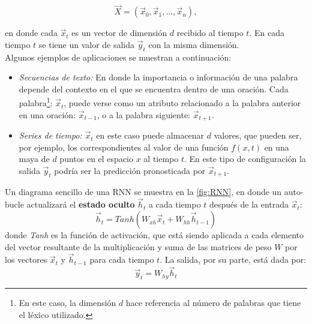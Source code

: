 \begin{equation}
  \label{eq:xdataRNN}
  \vec{X} = (\vec{x}_0, \vec{x}_1, \dots , \vec{x}_n),
\end{equation}

\noindent en donde cada $\vec{x}_t$ es un vector de dimensión $d$ recibido al tiempo $t$. En cada tiempo $t$ se tiene un valor de salida $\vec{y}_t$ con la misma dimensión.
\\
Algunos ejemplos de aplicaciones se muestran a continuación:  

\begin{itemize}[label=\textcolor{CTtitle}{\textbullet}]
\item \emph{Secuencias de texto:} \cite{Graves2013GeneratingSW} En donde la importancia o información de una palabra depende del contexto en el que se encuentra dentro de una oración. Cada palabra\footnote{En este caso, la dimensión $d$ hace referencia al número de palabras que tiene el léxico utilizado.}: $\vec{x}_t$,  puede verse como un atributo relacionado a la palabra anterior en una oración: $\vec{x}_{t-1}$, o a la palabra siguiente: $\vec{x}_{t+1}$.
 \item \emph{Series de tiempo:} \cite{ELMAN1990179} $\vec{x}_t$ en este caso puede almacenar $d$ valores, que pueden ser, por ejemplo, los correspondientes al valor de una función $f(x,t)$ en una maya de $d$ puntos en el espacio $x$ al tiempo $t$. En este tipo de configuración la salida $\vec{y}_t$ podría ser la predicción pronosticada por $\vec{x}_{t+1}$.
 \end{itemize}
  
Un diagrama sencillo de una \acs{RNN} se muestra en la \autoref{fig:RNN}, en donde un auto-bucle actualizará el \textbf{estado oculto} $\vec{h}_t$ a cada tiempo $t$ después de la entrada $\vec{x}_t$:
\begin{equation}
  \label{eq:hidden}
  \vec{h}_t = Tanh(W_{xh}\vec{x}_t + W_{hh} \vec{h}_{t-1})
\end{equation}
donde \emph{Tanh} es la función de activación, que está siendo aplicada a cada elemento del vector resultante de la multiplicación y suma de las matrices de peso $W$ por los vectores $\vec{x}_t$ y $\vec{h}_{t-1}$ para cada tiempo $t$. La salida, por su parte, está dada por:
\begin{equation}
  \vec{y}_t = W_{hy}\vec{h}_t
\end{equation}

